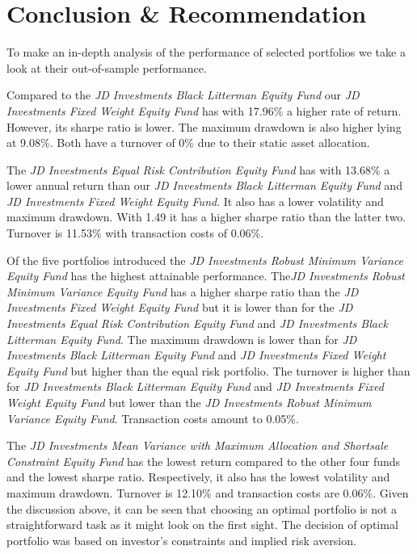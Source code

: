 \documentclass[11pt, parskip=full, DIV=14]{scrreprt}
\begin{document}
\chapter{Conclusion \& Recommendation}
To make an in-depth analysis of the performance of selected portfolios we take a look at their out-of-sample performance.

Compared to the \textit{JD Investments Black Litterman Equity Fund} our \textit{JD Investments Fixed Weight Equity Fund} has with 17.96\% a higher rate of return. However, its sharpe ratio is lower. The maximum drawdown is also higher lying at 9.08\%. Both have a turnover of 0\% due to their static asset allocation.

The \textit{JD Investments Equal Risk Contribution Equity Fund} has with 13.68\% a lower annual return than our \textit{JD Investments Black Litterman Equity Fund} and \textit{JD Investments Fixed Weight Equity Fund}. It also has a lower volatility and maximum drawdown. With 1.49 it has a higher sharpe ratio than the latter two. Turnover is 11.53\% with transaction costs of 0.06\%. 

Of the five portfolios introduced the \textit{JD Investments Robust Minimum Variance Equity Fund} has the highest attainable performance. The\textit{JD Investments Robust Minimum Variance Equity Fund} has a higher sharpe ratio than the \textit{JD Investments Fixed Weight Equity Fund} but it is lower than for the \textit{JD Investments Equal Risk Contribution Equity Fund} and \textit{JD Investments Black Litterman Equity Fund}. The maximum drawdown is lower than for \textit{JD Investments Black Litterman Equity Fund} and \textit{JD Investments Fixed Weight Equity Fund} but higher than the equal risk portfolio. The turnover is higher than for \textit{JD Investments Black Litterman Equity Fund} and \textit{JD Investments Fixed Weight Equity Fund} but lower than the \textit{JD Investments Robust Minimum Variance Equity Fund}. Transaction costs amount to 0.05\%.

The \textit{JD Investments Mean Variance with Maximum Allocation and Shortsale Constraint Equity Fund} has the lowest return compared to the other four funds and the lowest sharpe ratio. Respectively, it also has the lowest volatility and maximum drawdown. Turnover is 12.10\% and transaction costs are 0.06\%. Given the discussion above, it can be seen that choosing an optimal portfolio is not a straightforward task as it might look on the first sight. The decision of optimal portfolio was based on investor’s constraints and implied risk aversion. 
\end{document}
